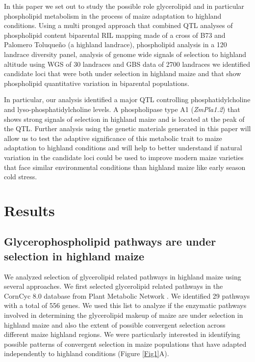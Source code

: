\documentclass[9pt,twocolumn,twoside,lineno]{gsajnl}
\begin{document}
In this paper we set out to study the possible role glycerolipid and in particular phospholipid metabolism in the process of maize adaptation to highland conditions. 
Using a multi pronged approach that combined QTL analyses of phospholipid content biparental RIL mapping made of a cross of B73 and Palomero Toluqueño (a highland landrace), phospholipid analysis in a 120 landrace diversity panel, analysis of genome wide signals of selection to highland altitude using WGS of 30 landraces and GBS data of 2700 landraces we identified candidate loci  that were both under selection in highland maize and that show phospholipid quantitative variation  in biparental populations. 

In particular, our analysis identified a major QTL controlling phosphatidylcholine and lyso-phosphatidylcholine levels. A phospholipase type A1 (\textit{ZmPla1.2}) that shows strong signals of selection in highland maize and is located at the peak of the QTL. Further analysis using the genetic materials generated in this paper will allow us to test the adaptive significance of this metabolic trait to maize adaptation to highland conditions and will help to better understand if natural variation in the candidate loci could be used to improve modern maize varieties that face similar environmental conditions than highland maize like early season cold stress. 
\section{Results}
\label{sec:results}

\subsection{Glycerophospholipid pathways are under selection in  highland maize} 
We analyzed selection of glycerolipid related pathways in highland maize using several approaches. 
We first selected glycerolipid related pathways in the CornCyc 8.0 database from  Plant Metabolic Network \cite{Schlapfer2017-yl}. We identified 29 pathways with a total of 556 genes. 
We used this list to analyze if the enzymatic pathways involved in determining the glycerolipid makeup of maize are under selection in highland maize and also the extent of possible convergent selection across different maize highland regions. 
We were particularly interested in identifying possible patterns of convergent selection in maize populations that have adapted independently to highland conditions (Figure \ref{Fig1}A).  
\end{document}
